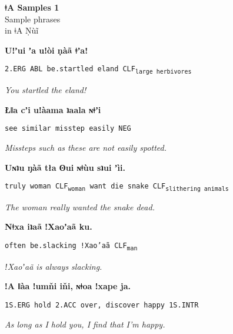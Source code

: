 \documentclass[12pt,aspectratio=169]{beamer}
\newcommand{\interlinearslide}[3]{
\begin{frame}
	\begin{center}
		\vfill
		
		\textbf{\huge #1}
		
		\vfill
		
		{\large \texttt{#2}}
		
		\vfill
		
		{\textit{\large #3}}
		
		
	\end{center}
\end{frame}
}
\newcommand{\CLF}[1]{CLF\textsubscript{#1}}
\begin{document}
\begin{frame}

\begin{center}
{\Huge \textbf{ǂA Samples 1}}\\
\vspace{1.5cm}
{\LARGE Sample phrases \\
in ǂA Ṇùĩ}
\end{center}

\end{frame}

\interlinearslide{Uǃʼui ʼa uǃòi ṇàã ǂʼa!}{2.ERG ABL be.startled eland \CLF{large herbivores}}{You startled the eland!}
\interlinearslide{Łǁa cʼi uǃàama ʇaala ɴǂʼi}{see 	similar 	misstep 	easily 	NEG}{Missteps such as these are not easily spotted.}
\interlinearslide{Uɴʇu ŋàã tła ʘui ɴǂùu sʇui ʼìi.}{truly 	woman 	\CLF{woman} 	want 	die 	snake 	\CLF{slithering animals} }{The woman really wanted the snake dead.}
\interlinearslide{Nǂxa iʇaã ǃXaoʼaã ku.}{often be.slacking !Xao'aã \CLF{man}}{ǃXaoʼaã is always slacking.}
\interlinearslide{ǃA ǁàa ǃumňi iňi, ɴǂoa ǃxape ja.}{1S.ERG 	hold 	2.ACC 	over,		discover 	happy 	1S.INTR}{As long as I hold you, I find that I'm happy.}


%
%
%
%
%
%
%
%
%
\end{document}
